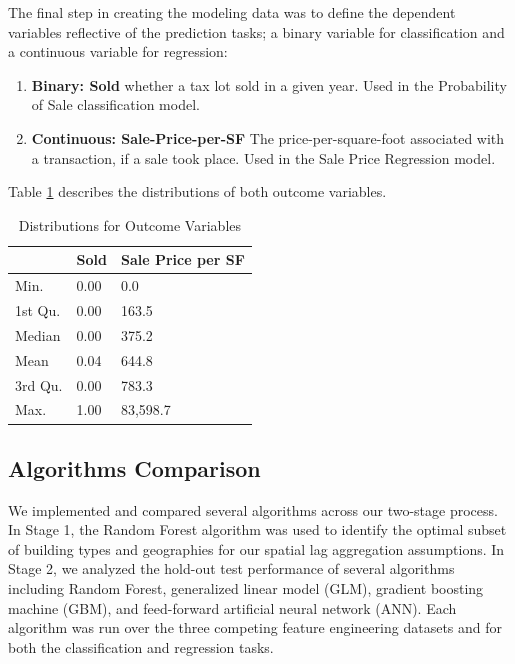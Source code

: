\documentclass[conference,final,]{IEEEtran}
\providecommand{\tightlist}{%
  \setlength{\itemsep}{0pt}\setlength{\parskip}{0pt}}
\begin{document}
The final step in creating the modeling data was to define the dependent
variables reflective of the prediction tasks; a binary variable for
classification and a continuous variable for regression:

\begin{enumerate}
\def\labelenumi{\arabic{enumi})}
\tightlist
\item
  \textbf{Binary: Sold} whether a tax lot sold in a given year. Used in
  the Probability of Sale classification model.
\item
  \textbf{Continuous: Sale-Price-per-SF} The price-per-square-foot
  associated with a transaction, if a sale took place. Used in the Sale
  Price Regression model.
\end{enumerate}

\noindent Table \ref{tab:OutcomeDistro} describes the distributions of
both outcome variables.

\begin{table}

\caption{\label{tab:table 4}\label{tab:OutcomeDistro} Distributions for Outcome Variables}
\centering
\begin{tabular}[t]{l|l|l}
\hline
  & Sold & Sale Price per SF\\
\hline
Min. & 0.00 & 0.0\\
\hline
1st Qu. & 0.00 & 163.5\\
\hline
Median & 0.00 & 375.2\\
\hline
Mean & 0.04 & 644.8\\
\hline
3rd Qu. & 0.00 & 783.3\\
\hline
Max. & 1.00 & 83,598.7\\
\hline
\end{tabular}
\end{table}

\hypertarget{algorithms-comparison}{%
\subsection{Algorithms Comparison}\label{algorithms-comparison}}

We implemented and compared several algorithms across our two-stage
process. In Stage 1, the Random Forest algorithm was used to identify
the optimal subset of building types and geographies for our spatial lag
aggregation assumptions. In Stage 2, we analyzed the hold-out test
performance of several algorithms including Random Forest, generalized
linear model (GLM), gradient boosting machine (GBM), and feed-forward
artificial neural network (ANN). Each algorithm was run over the three
competing feature engineering datasets and for both the classification
and regression tasks.
\end{document}
